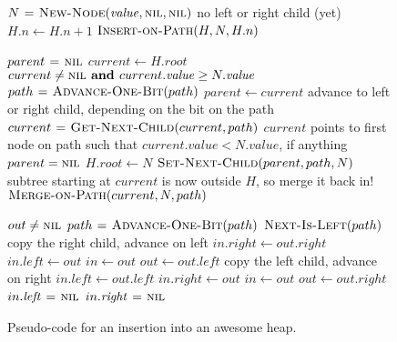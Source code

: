 \begin{figure}[htbp!]
\begin{codebox}
\li $N \mathrel{\hspace{1pt}=\hspace{1pt}} \textnormal{\scshape New-Node}(\mathit{value}, \textnormal{\scshape nil}, \textnormal{\scshape nil})$ \Comment no left or
right child (yet)
\li $H.n \gets H.n + 1$
\li $\textnormal{\scshape Insert-on-Path}(H, N, H.n)$
\End
\end{codebox}
\begin{codebox}
\li $parent \mathrel{\hspace{1pt}=\hspace{1pt}} \textnormal{\scshape nil}$
\li $current \gets H.root$
\li \While $current \neq \textnormal{\scshape nil} \textbf{ and } current.\mathit{value} \geq N.\mathit{value}$ \Do
\li   $path \mathrel{\hspace{1pt}=\hspace{1pt}} \textnormal{\scshape Advance-One-Bit}(path)$
\li   $parent \gets current$
\zi   \Comment advance to left or right child, depending on the bit on the path
\li   $current \mathrel{\hspace{1pt}=\hspace{1pt}} \textnormal{\scshape Get-Next-Child}(current, path)$
\End
\zi \Comment $current$ points to first node on path such that $current.\mathit{value} <
N.\mathit{value}$, if anything
\li \If $parent = \textnormal{\scshape nil}$ \Then
\li   $H.root \gets N$
\li \Else
\li   $\textnormal{\scshape Set-Next-Child}(parent, path, N)$
\End
\zi \Comment subtree starting at $current$ is now outside $H$, so merge it back
in!
\li $\textnormal{\scshape Merge-on-Path}(current, N, path)$
\end{codebox}
\begin{codebox}
\li \While $out \neq \textnormal{\scshape nil}$ \Do
\li   $path \mathrel{\hspace{1pt}=\hspace{1pt}} \textnormal{\scshape Advance-One-Bit}(path)$
\li   \If $\textnormal{\scshape Next-Is-Left}(path)$ \Then
\zi     \Comment copy the right child, advance on left
\li     $in.\mathit{right} \gets out.\mathit{right}$
\li     $in.\mathit{left} \gets out$
\li     $in \gets out$
\li     $out \gets out.\mathit{left}$
\li   \Else
\zi     \Comment copy the left child, advance on right
\li     $in.\mathit{left} \gets out.\mathit{left}$
\li     $in.\mathit{right} \gets out$
\li     $in \gets out$
\li     $out \gets out.\mathit{right}$
\End
\End
\li $in.\mathit{left} \mathrel{\hspace{1pt}=\hspace{1pt}} \textnormal{\scshape nil}$
\li $in.\mathit{right} \mathrel{\hspace{1pt}=\hspace{1pt}} \textnormal{\scshape nil}$
\end{codebox}
\caption[]{Pseudo-code for an insertion into an awesome heap.}
\label{code:insert}
\end{figure}
